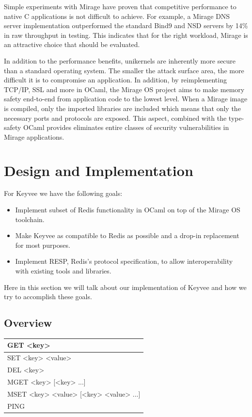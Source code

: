 \documentclass[english,10pt,twocolumn]{article}
\begin{document}
Simple experiments with Mirage have proven that competitive performance to native C applications is not difficult to achieve.
For example, a Mirage DNS server implementation outperformed the standard Bind9 and NSD servers by 14\% in raw throughput in testing.
This indicates that for the right workload, Mirage is an attractive choice that should be evaluated.

In addition to the performance benefits, unikernels are inherently more secure than a standard operating system.
The smaller the attack surface area, the more difficult it is to compromise an application.
In addition, by reimplementing TCP/IP, SSL and more in OCaml, the Mirage OS project aims to make memory safety end-to-end from application code to the lowest level.
When a Mirage image is compiled, only the imported libraries are included which means that only the necessary ports and protocols are exposed.
This aspect, combined with the type-safety OCaml provides eliminates entire classes of security vulnerabilities in Mirage applications.


\section{Design and Implementation}

For Keyvee we have the following goals:

\begin{itemize}
  \item Implement subset of Redis functionality in OCaml on top of the Mirage OS toolchain.
  \item Make Keyvee as compatible to Redis as possible and a drop-in replacement for most purposes.
  \item Implement RESP, Redis's protocol specification, to allow interoperability with existing tools and libraries.
\end{itemize}

Here in this section we will talk about our implementation of Keyvee and how we try to accomplish these goals.

\subsection{Overview}

\begin{center}
  \begin{tabular}{ | l | }
    \hline
    GET <key> \\ \hline
    SET <key> <value> \\ \hline
    DEL <key> \\ \hline
    MGET <key> [<key> ...] \\ \hline
    MSET <key> <value> [<key> <value> ...] \\ \hline
    PING \\ \hline
  \end{tabular}
\end{center}
\end{document}
